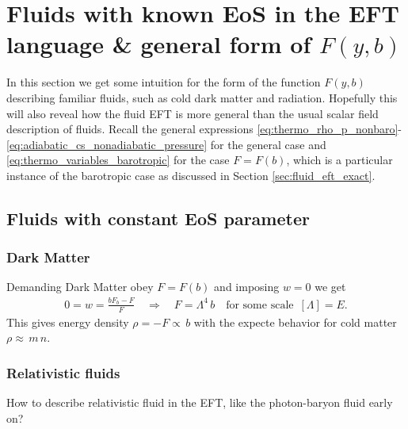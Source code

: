 \section{Fluids with known EoS in the EFT language \& general form of $F(y,b)$}

In this section we get some intuition for the form of the function $F(y,b)$ describing familiar fluids, such as cold dark matter and radiation.
Hopefully this will also reveal how the fluid EFT is more general than the usual scalar field description of fluids.
Recall the general expressions \eqref{eq:thermo_rho_p_nonbaro}-\eqref{eq:adiabatic_cs_nonadiabatic_pressure} for the general case and \eqref{eq:thermo_variables_barotropic} for the case $F=F(b)$, which is a particular instance of the barotropic case as discussed in Section \ref{sec:fluid_eft_exact}.

\subsection{Fluids with constant EoS parameter}

\subsubsection{Dark Matter}
%
Demanding Dark Matter obey $F=F(b)$ and imposing $w=0$ we get
\begin{align}
    0= w=\frac{bF_b-F}{F}\quad \Rightarrow\quad F=\Lambda^4 \,b\quad \text{for some scale } \, [\Lambda]=E.
\end{align}
This gives energy density $\rho=-F\propto \, b$ with the expecte behavior for cold matter $\rho \approx \, m \, n$.


\subsubsection{Relativistic fluids}
How to describe relativistic fluid in the EFT, like the photon-baryon fluid early on?

